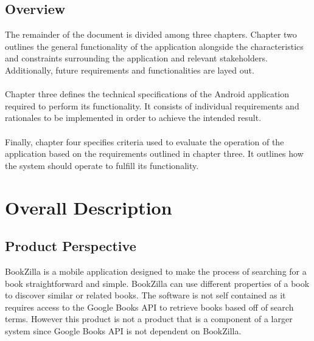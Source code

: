 \documentclass[12pt, titlepage, a4paper]{article}
\begin{document}
\subsection{Overview}
\label{sub:overview}
The remainder of the document is divided among three chapters. Chapter two outlines the general functionality of the application alongside the characteristics and constraints surrounding the application and relevant stakeholders. Additionally, future requirements and functionalities are layed out. \\ ~ \\
Chapter three defines the technical specifications of the Android application required to perform its functionality. It consists of individual requirements and rationales to be implemented in order to achieve the intended result. \\ ~ \\
Finally, chapter four specifies criteria used to evaluate the operation of the application based on the requirements outlined in chapter three. It outlines how the system should operate to fulfill its functionality.


\section{Overall Description}
\label{sec:overall_description}


\subsection{Product Perspective}
\label{sub:product_perspective}

BookZilla is a mobile application designed to make the process of searching for a book straightforward and simple. BookZilla can use different properties of a book to discover similar or related books. The software is not self contained as it requires access to the Google Books API to retrieve books based off of search terms. However this product is not a product that is a component of a larger system since Google Books API is not dependent on BookZilla.

\end{document}

